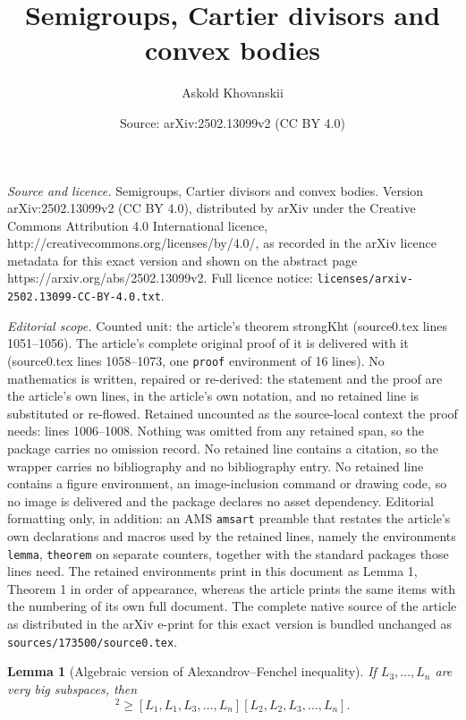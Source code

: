 \documentclass[10pt,a4paper]{amsart}
\title{Semigroups, Cartier divisors and convex bodies}
\author{Askold Khovanskii}
\date{Source: arXiv:2502.13099v2 (CC BY 4.0)}
\newtheorem{lemma}{Lemma}
\begin{document}
\maketitle

\noindent\emph{Source and licence.} Semigroups, Cartier divisors and convex bodies. Version arXiv:2502.13099v2 (CC BY 4.0), distributed by arXiv under the Creative Commons Attribution 4.0 International licence, http://creativecommons.org/licenses/by/4.0/, as recorded in the arXiv licence metadata for this exact version and shown on the abstract page https://arxiv.org/abs/2502.13099v2. Full licence notice: \texttt{licenses/arxiv-2502.13099-CC-BY-4.0.txt}.\par\smallskip

\noindent\textit{Editorial scope.} Counted unit: the article's theorem strongKht (source0.tex lines 1051--1056). The article's complete original proof of it is delivered with it (source0.tex lines 1058--1073, one \texttt{proof} environment of 16 lines). No mathematics is written, repaired or re-derived: the statement and the proof are the article's own lines, in the article's own notation, and no retained line is substituted or re-flowed.  Retained uncounted as the source-local context the proof needs: lines 1006--1008.  Nothing was omitted from any retained span, so the package carries no omission record.  No retained line contains a citation, so the wrapper carries no bibliography and no bibliography entry.  No retained line contains a figure environment, an image-inclusion command or drawing code, so no image is delivered and the package declares no asset dependency.  Editorial formatting only, in addition: an AMS \texttt{amsart} preamble that restates the article's own declarations and macros used by the retained lines, namely the environments \texttt{lemma}, \texttt{theorem} on separate counters, together with the standard packages those lines need.  The retained environments print in this document as Lemma 1, Theorem 1 in order of appearance, whereas the article prints the same items with the numbering of its own full document.  The complete native source of the article as distributed in the arXiv e-print for this exact version is bundled unchanged as \texttt{sources/173500/source0.tex}.
\begin{lemma}[Algebraic version of Alexandrov--Fenchel  inequality]\label{weakKht} If $L_3,\dots,L_n$ are very big  subspaces, then
\begin{equation*}[L_1, L_2, L_3,\dots, L_n]^2 \geq [L_1,L_1, L_3, \dots, L_n][L_2,L_2, L_3, \dots, L_n].\end{equation*}
\end{lemma}
\end{document}
